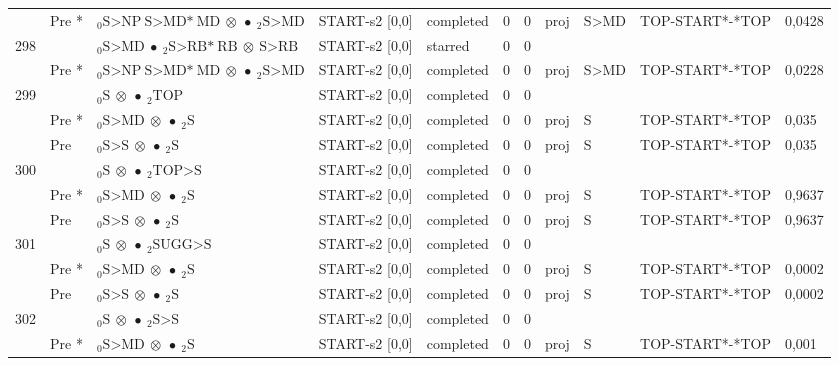 \documentclass[10pt]{article}
\begin{document}
\begin{longtable}[htbp]{lllllllllll}
 & Pre *& $ {}_0 \textrm{S>NP} \ \textrm{S>MD*} \ \textrm{MD} \  \otimes \  \bullet \ {}_{2} \textrm{S>MD} $ & START-s2 [0,0] & completed & 0 & 0 & proj & S>MD & TOP-START*-*TOP & 0,0428 \\ 
298 & & $ {}_0 \textrm{S>MD} \  \bullet \ {}_{2} \textrm{S>RB*} \ \textrm{RB} \  \otimes \ \textrm{S>RB} $ & START-s2 [0,0] & starred & 0 & 0 & & & & \\ 
 & Pre *& $ {}_0 \textrm{S>NP} \ \textrm{S>MD*} \ \textrm{MD} \  \otimes \  \bullet \ {}_{2} \textrm{S>MD} $ & START-s2 [0,0] & completed & 0 & 0 & proj & S>MD & TOP-START*-*TOP & 0,0228 \\ 
299 & & $ {}_0 \textrm{S} \  \otimes \  \bullet \ {}_{2} \textrm{TOP} $ & START-s2 [0,0] & completed & 0 & 0 & & & & \\ 
 & Pre *& $ {}_0 \textrm{S>MD} \  \otimes \  \bullet \ {}_{2} \textrm{S} $ & START-s2 [0,0] & completed & 0 & 0 & proj & S & TOP-START*-*TOP & 0,035 \\ 
 & Pre & $ {}_0 \textrm{S>S} \  \otimes \  \bullet \ {}_{2} \textrm{S} $ & START-s2 [0,0] & completed & 0 & 0 & proj & S & TOP-START*-*TOP & 0,035 \\ 
300 & & $ {}_0 \textrm{S} \  \otimes \  \bullet \ {}_{2} \textrm{TOP>S} $ & START-s2 [0,0] & completed & 0 & 0 & & & & \\ 
 & Pre *& $ {}_0 \textrm{S>MD} \  \otimes \  \bullet \ {}_{2} \textrm{S} $ & START-s2 [0,0] & completed & 0 & 0 & proj & S & TOP-START*-*TOP & 0,9637 \\ 
 & Pre & $ {}_0 \textrm{S>S} \  \otimes \  \bullet \ {}_{2} \textrm{S} $ & START-s2 [0,0] & completed & 0 & 0 & proj & S & TOP-START*-*TOP & 0,9637 \\ 
301 & & $ {}_0 \textrm{S} \  \otimes \  \bullet \ {}_{2} \textrm{SUGG>S} $ & START-s2 [0,0] & completed & 0 & 0 & & & & \\ 
 & Pre *& $ {}_0 \textrm{S>MD} \  \otimes \  \bullet \ {}_{2} \textrm{S} $ & START-s2 [0,0] & completed & 0 & 0 & proj & S & TOP-START*-*TOP & 0,0002 \\ 
 & Pre & $ {}_0 \textrm{S>S} \  \otimes \  \bullet \ {}_{2} \textrm{S} $ & START-s2 [0,0] & completed & 0 & 0 & proj & S & TOP-START*-*TOP & 0,0002 \\ 
302 & & $ {}_0 \textrm{S} \  \otimes \  \bullet \ {}_{2} \textrm{S>S} $ & START-s2 [0,0] & completed & 0 & 0 & & & & \\ 
 & Pre *& $ {}_0 \textrm{S>MD} \  \otimes \  \bullet \ {}_{2} \textrm{S} $ & START-s2 [0,0] & completed & 0 & 0 & proj & S & TOP-START*-*TOP & 0,001 \\ 

\end{longtable}
\end{document}
